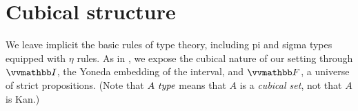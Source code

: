 \documentclass[final]{amsart}
\begin{document}
\section{Cubical structure}

We leave implicit the basic rules of type theory, including pi and sigma types
equipped with $\eta$ rules. As in \citep{orton-pitts:2016,abcfhl:2019}, we
expose the cubical nature of our setting through $\DIM$, the Yoneda embedding of
the interval, and $\COF$, a universe of strict propositions. (Note that
$A\ \mathit{type}$ means that $A$ is a \emph{cubical set}, not that $A$ is Kan.)

\end{document}
